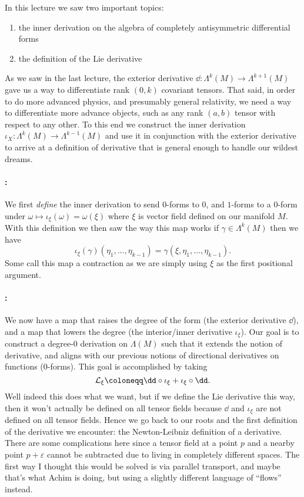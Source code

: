 \documentclass{homework}
\begin{document}
In this lecture we saw two important topics:
\begin{enumerate}
	\item the inner derivation on the algebra of completely antisymmetric differential forms\label{it:inner}
	\item the definition of the Lie derivative\label{it:lie}
\end{enumerate}

As we saw in the last lecture, the exterior derivative $\dd : \Lambda^k(M)\to\Lambda^{k+1}(M)$ gave us a way to differentiate rank $(0, k)$ covariant tensors.
That said, in order to do more advanced physics, and presumably general relativity, we need a way to differentiate more advance objects, such as any rank $(a, b)$ tensor with respect to any other.
To this end we construct the inner derivation $\iota_X :\Lambda^k(M)\to \Lambda^{k-1}(M)$ and use it in conjunction with the exterior derivative to arrive at a definition of derivative that is general enough to handle our wildest dreams.

\paragraph{:}
We first \emph{define} the inner derivation to send $0$-forms to 0, and $1$-forms to a $0$-form under $\omega\mapsto \iota_\xi(\omega) = \omega(\xi)$ where $\xi$ is vector field defined on our manifold $M$.
With this definition we then saw the way this map works if $\gamma\in\Lambda^k(M)$ then we have
\begin{equation*}
	\iota_\xi(\gamma)(\eta_1,\ldots,\eta_{k-1}) = \gamma(\xi,\eta_1,\ldots,\eta_{k-1}).
\end{equation*}
Some call this map a contraction as we are simply using $\xi$ as the first positional argument.

\paragraph{:}
We now have a map that raises the degree of the form (the exterior derivative $\dd$), and a map that lowers the degree (the interior/inner derivative $\iota_\xi$).
Our goal is to construct a degree-0 derivation on $\Lambda(M)$ such that it extends the notion of derivative, and aligns with our previous notions of directional derivatives on functions (0-forms).
This goal is accomplished by taking
\begin{equation*}
	\mathcal{L}_\xi\defeq \dd\circ\iota_\xi + \iota_\xi\circ\dd.
\end{equation*}
Well indeed this does what we want, but if we define the Lie derivative this way, then it won't actually be defined on all tensor fields because $\dd$ and $\iota_\xi$ are not defined on all tensor fields.
Hence we go back to our roots and the first definition of the derivative we encounter: the Newton-Leibniz definition of a derivative.
There are some complications here since a tensor field at a point $p$ and a nearby point $p + \varepsilon$ cannot be subtracted due to living in completely different spaces.
The first way I thought this would be solved is via parallel transport, and maybe that's what Achim is doing, but using a slightly different language of ``flows'' instead.
\end{document}
